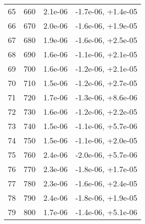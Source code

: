\begin{table}
\begin{adjustbox}{width=1\textwidth/2}
\begin{tabular}{|c|c|c|c|}
\cline{1-4}
65 & 660 & 2.1e-06 & -1.7e-06, +1.4e-05 \\
\cline{1-4}
66 & 670 & 2.0e-06 & -1.6e-06, +1.9e-05 \\
\cline{1-4}
67 & 680 & 1.9e-06 & -1.6e-06, +2.5e-05 \\
\cline{1-4}
68 & 690 & 1.6e-06 & -1.1e-06, +2.1e-05 \\
\cline{1-4}
69 & 700 & 1.6e-06 & -1.2e-06, +2.1e-05 \\
\cline{1-4}
70 & 710 & 1.5e-06 & -1.2e-06, +2.7e-05 \\
\cline{1-4}
71 & 720 & 1.7e-06 & -1.3e-06, +8.6e-06 \\
\cline{1-4}
72 & 730 & 1.6e-06 & -1.2e-06, +2.2e-05 \\
\cline{1-4}
73 & 740 & 1.5e-06 & -1.1e-06, +5.7e-06 \\
\cline{1-4}
74 & 750 & 1.5e-06 & -1.1e-06, +2.0e-05 \\
\cline{1-4}
75 & 760 & 2.4e-06 & -2.0e-06, +5.7e-06 \\
\cline{1-4}
76 & 770 & 2.3e-06 & -1.8e-06, +1.7e-05 \\
\cline{1-4}
77 & 780 & 2.3e-06 & -1.6e-06, +2.4e-05 \\
\cline{1-4}
78 & 790 & 2.4e-06 & -1.8e-06, +1.9e-05 \\
\cline{1-4}
79 & 800 & 1.7e-06 & -1.4e-06, +5.1e-06 \\
\cline{1-4}
\end{tabular}
\end{adjustbox}
\end{table}

